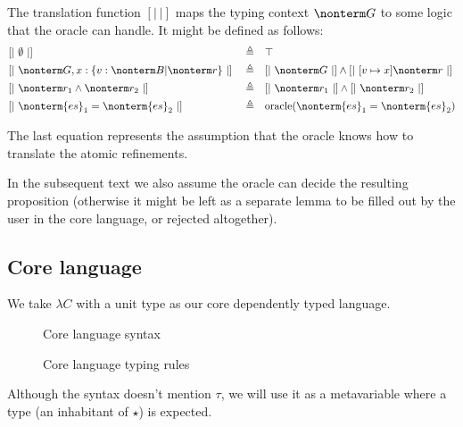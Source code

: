 \documentclass[a4paper]{article}
\begin{document}
The translation function $[|\ |]$ maps the typing context $\nonterm G$ to some logic
that the oracle can handle.
It might be defined as follows:
\begin{equation}
\begin{aligned}
  & [|\ \emptyset\ |]                                         && \triangleq && \top																						            \\
  & [|\ \nonterm G, x : \{ v : \nonterm B | \nonterm r \}\ |] && \triangleq && [|\ \nonterm G\ |] \land [|\ [ v \mapsto x ] \nonterm r\ |]  \\
  & [|\ \nonterm r_1 \land \nonterm r_2\ |]                   && \triangleq && [|\ \nonterm r_1\ |] \land [|\ \nonterm r_2\ |]              \\
  & [|\ \nonterm{es}_1 = \nonterm{es}_2\ |]                   && \triangleq && \text{oracle}(\nonterm{es}_1 = \nonterm{es}_2)             \\
\end{aligned}
\end{equation}

The last equation represents the assumption
that the oracle knows how to translate the atomic refinements.


In the subsequent text we also assume the oracle can decide the resulting proposition
(otherwise it might be left as a separate lemma to be filled out by the user in the core language, or rejected altogether).

\subsection{Core language}

We take $\lambda C$ \cite{TTFPLambdaC}
with a unit type as our core dependently typed language.

\begin{figure}[ht]
  \footnotesize
  \caption{Core language syntax}
  \label{fig:core_syntax}
\end{figure}

\begin{figure}[ht]
  \footnotesize
  \caption{Core language typing rules}
  \label{fig:core_typing}
\end{figure}

Although the syntax doesn't mention $\tau$, we will use it as a metavariable
where a type (an inhabitant of $\star$) is expected.
\end{document}
